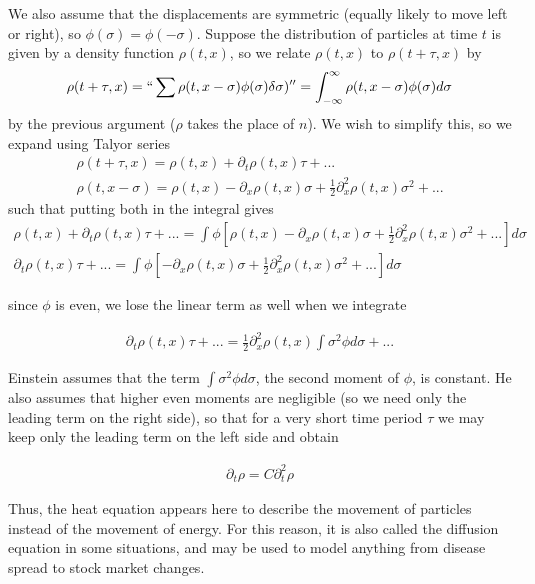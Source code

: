 \documentclass{article}
\newcommand{\pd}{\partial}
\begin{document}
	We also assume that the displacements are symmetric (equally likely to move left or right), so $\phi(\sigma) = \phi(-\sigma)$. Suppose the distribution of particles at time $t$ is given by a density function $\rho(t,x)$, so we relate $\rho(t,x)$ to $\rho(t+\tau,x)$ by 
	\begin{align*}
		\rho(t+\tau,x) = `` \sum \rho(t,x-\sigma)\phi(\sigma)\delta\sigma) '' = \int_{-\infty}^{\infty} \rho(t,x-\sigma)\phi(\sigma)d\sigma
	\end{align*}
	by the previous argument ($\rho$ takes the place of $n$). We wish to simplify this, so we expand using Talyor series
	\begin{align*}
		\rho(t+\tau,x) = \rho(t,x) + \pd_{t}\rho (t,x)\tau + ... \\
		\rho(t,x-\sigma) = \rho(t,x) - \pd_{x}\rho(t,x)\sigma + \frac{1}{2} \pd_{x}^{2} \rho(t,x) \sigma^{2} + ...
	\end{align*}
	such that putting both in the integral gives 
	\begin{align*}
		\rho(t,x) +\pd_{t}\rho (t,x)\tau + ... = \int \phi \left[ \rho(t,x) - \pd_{x}\rho(t,x)\sigma + \frac{1}{2} \pd_{x}^{2} \rho(t,x) \sigma^{2} + ... \right] d\sigma \\
		\pd_{t}\rho (t,x)\tau + ... = \int \phi \left[ - \pd_{x}\rho(t,x)\sigma + \frac{1}{2} \pd_{x}^{2} \rho(t,x) \sigma^{2} + ... \right] d\sigma
	\end{align*}
	
	since $\phi$ is even, we lose the linear term as well when we integrate
	
	\begin{align*}
	\pd_{t}\rho (t,x)\tau + ... = \frac{1}{2} \pd_{x}^{2} \rho(t,x) \int \sigma^{2} \phi d\sigma + ...
	\end{align*}
	
	Einstein assumes that the term $\int \sigma^{2} \phi d\sigma$, the second moment of $\phi$, is constant. He also assumes that higher even moments are negligible (so we need only the leading term on the right side), so that for a very short time period $\tau$ we may keep only the leading term on the left side and obtain 
	
	\begin{align*}
		\pd_{t} \rho = C \pd_{t}^{2} \rho
	\end{align*}
	
	Thus, the heat equation appears here to describe the movement of particles instead of the movement of energy. For this reason, it is also called the diffusion equation in some situations, and may be used to model anything from disease spread to stock market changes. 
	
\end{document}
